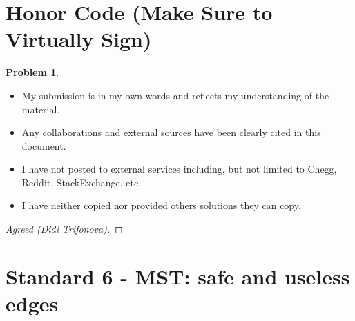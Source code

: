 \documentclass[11pt]{article}
\theoremstyle{definition}
\theoremstyle{definition}
\newtheorem{required}{Problem}
\theoremstyle{definition}
\begin{document}
\section{Honor Code (Make Sure to Virtually Sign)} \label{HonorCode}

\begin{required}
\begin{itemize}
\item My submission is in my own words and reflects my understanding of the material.
\item Any collaborations and external sources have been clearly cited in this document.
\item I have not posted to external services including, but not limited to Chegg, Reddit, StackExchange, etc.
\item I have neither copied nor provided others solutions they can copy.
\end{itemize}

\end{required}

\begin{proof}[Agreed (Didi Trifonova)]
\end{proof}



\newpage
\section{Standard 6 - MST: safe and useless edges}
\end{document}
